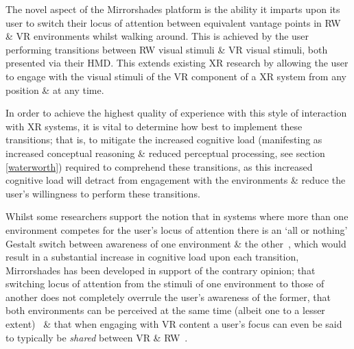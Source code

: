 \newcommand{\breakinpresencefootnote}{\footnote{The definition of \textbf{break in presence} adopted herein is the second from Waterworth \& Waterworth~\cite{Waterworth2001} (p205): a movement along the focus axis away from presence in the real or a virtual environment \& toward absence. This differs to Slater \& Steed's original definition in~\cite{Slater2000} as they considered presence only in terms of attending to stimuli from a virtual environment, with a break in presence as a Gestalt switch to instead attending to stimuli from the real environment. Waterworth \& Waterworth's model considers presence in terms of attending to stimuli from either the real \textit{or a virtual} environment, with a break in presence representing absence in the sense of heightened conceptual load \& the resultant reduced perceptual processing of environmental stimuli originating from \textit{either} the real or a virtual environment. This definition better fits the situation invoked by the Mirrorshades platform, which is concerned with intentionally \& willingly switching engagement between stimuli from both real \& virtual environments, rather than engaging with stimuli from only a virtual environment in a scenario where stimuli from the real environment are considered a `distraction'.}}

The novel aspect of the Mirrorshades platform is the ability it imparts upon its user to switch their locus of attention between equivalent vantage points in RW \& VR environments whilst walking around. This is achieved by the user performing transitions between RW visual stimuli \& VR visual stimuli, both presented via their HMD. This extends existing XR research by allowing the user to engage with the visual stimuli of the VR component of a XR system from any position \& at any time.

In order to achieve the highest quality of experience with this style of interaction with XR systems, it is vital to determine how best to implement these transitions; that is, to mitigate the increased cognitive load (manifesting as increased conceptual reasoning \& reduced perceptual processing, see section \ref{waterworth}) required to comprehend these transitions, as this increased cognitive load will detract from engagement with the environments \& reduce the user's willingness to perform these transitions.

Whilst some researchers support the notion that in systems where more than one environment competes for the user's locus of attention there is an `all or nothing' Gestalt switch between awareness of one environment \& the other~\cite{Slater2002}, which would result in a substantial increase in cognitive load upon each transition, Mirrorshades has been developed in support of the contrary opinion; that switching locus of attention from the stimuli of one environment to those of another does not completely overrule the user's awareness of the former, that both environments can be perceived at the same time (albeit one to a lesser extent)~\cite{Ijsselsteijn2001} \& that when engaging with VR content a user's focus can even be said to typically be \textit{shared} between VR \& RW~\cite{Waterworth2001}.

